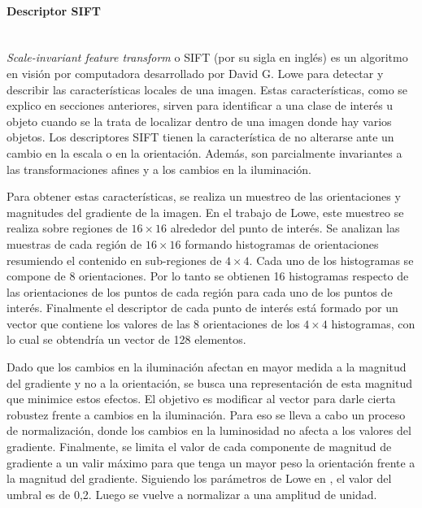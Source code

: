 \paragraph{Descriptor SIFT} ~\\

	\textit{Scale-invariant feature transform} o SIFT (por su sigla en inglés) es un algoritmo en visión por computadora desarrollado por David G. Lowe \cite{LoweDavid04} para detectar y describir las características locales de una imagen. Estas características, como se explico en secciones anteriores, sirven para identificar a una clase de interés u objeto cuando se la trata de localizar dentro de una imagen donde hay varios objetos. Los descriptores SIFT tienen la característica de no alterarse ante un cambio en la escala o en la orientación. Además, son parcialmente invariantes a las transformaciones afines y a los cambios en la iluminación.
		
	Para obtener estas características, se realiza un muestreo de las orientaciones y magnitudes del gradiente de la imagen. En el trabajo de Lowe, este muestreo se realiza sobre regiones de $16 \times 16$ alrededor del punto de interés. Se analizan las muestras de cada región de $16 \times 16$ formando histogramas de orientaciones resumiendo el contenido en sub-regiones de $4 \times 4$. Cada uno de los histogramas se compone de 8 orientaciones. Por lo tanto se obtienen 16 histogramas respecto de las orientaciones de los puntos de cada región para cada uno de los puntos de interés. Finalmente el descriptor de cada punto de interés está formado por un vector que contiene los valores de las 8 orientaciones de los $4 \times 4$ histogramas, con lo cual se obtendría un vector de 128 elementos.

	Dado que los cambios en la iluminación afectan en mayor medida a la magnitud del gradiente y no a la orientación, se busca una representación de esta magnitud que minimice estos efectos. El objetivo es modificar al vector para darle cierta robustez frente a cambios en la iluminación. Para eso se lleva a cabo un proceso de normalización, donde los cambios en la luminosidad no afecta a los valores del gradiente. Finalmente, se limita el valor de cada componente de magnitud de gradiente a un valir máximo para que tenga un mayor peso la orientación frente a la magnitud del gradiente. Siguiendo los parámetros de Lowe en \cite{LoweDavid04}, el valor del umbral es de 0,2. Luego se vuelve a normalizar a una amplitud de unidad.

	
	